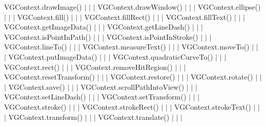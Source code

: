 {\ttfamily V\+G\+Context.\+draw\+Image()} $\vert$ $\vert$ $\vert$ {\ttfamily V\+G\+Context.\+draw\+Window()} $\vert$ $\vert$ $\vert$ {\ttfamily V\+G\+Context.\+ellipse()} $\vert$ $\vert$ $\vert$ {\ttfamily V\+G\+Context.\+fill()} $\vert$ $\vert$ $\vert$ {\ttfamily V\+G\+Context.\+fill\+Rect()} $\vert$ $\vert$ $\vert$ {\ttfamily V\+G\+Context.\+fill\+Text()} $\vert$ $\vert$ $\vert$ {\ttfamily V\+G\+Context.\+get\+Image\+Data()} $\vert$ $\vert$ $\vert$ {\ttfamily V\+G\+Context.\+get\+Line\+Dash()} $\vert$ $\vert$ $\vert$ {\ttfamily V\+G\+Context.\+is\+Point\+In\+Path()} $\vert$ $\vert$ $\vert$ {\ttfamily V\+G\+Context.\+is\+Point\+In\+Stroke()} $\vert$ $\vert$ $\vert$ {\ttfamily V\+G\+Context.\+line\+To()} $\vert$ $\vert$ $\vert$ {\ttfamily V\+G\+Context.\+measure\+Text()} $\vert$ $\vert$ $\vert$ {\ttfamily V\+G\+Context.\+move\+To()} $\vert$ $\vert$ $\vert$ {\ttfamily V\+G\+Context.\+put\+Image\+Data()} $\vert$ $\vert$ $\vert$ {\ttfamily V\+G\+Context.\+quadratic\+Curve\+To()} $\vert$ $\vert$ $\vert$ {\ttfamily V\+G\+Context.\+rect()} $\vert$ $\vert$ $\vert$ {\ttfamily V\+G\+Context.\+remove\+Hit\+Region()} $\vert$ $\vert$ $\vert$ {\ttfamily V\+G\+Context.\+reset\+Transform()} $\vert$ $\vert$ $\vert$ {\ttfamily V\+G\+Context.\+restore()} $\vert$ $\vert$ $\vert$ {\ttfamily V\+G\+Context.\+rotate()} $\vert$ $\vert$ $\vert$ {\ttfamily V\+G\+Context.\+save()} $\vert$ $\vert$ $\vert$ {\ttfamily V\+G\+Context.\+scroll\+Path\+Into\+View()} $\vert$ $\vert$ $\vert$ {\ttfamily V\+G\+Context.\+set\+Line\+Dash()} $\vert$ $\vert$ $\vert$ {\ttfamily V\+G\+Context.\+set\+Transform()} $\vert$ $\vert$ $\vert$ {\ttfamily V\+G\+Context.\+stroke()} $\vert$ $\vert$ $\vert$ {\ttfamily V\+G\+Context.\+stroke\+Rect()} $\vert$ $\vert$ $\vert$ {\ttfamily V\+G\+Context.\+stroke\+Text()} $\vert$ $\vert$ $\vert$ {\ttfamily V\+G\+Context.\+transform()} $\vert$ $\vert$ $\vert$ {\ttfamily V\+G\+Context.\+translate()} $\vert$ $\vert$ $\vert$ 